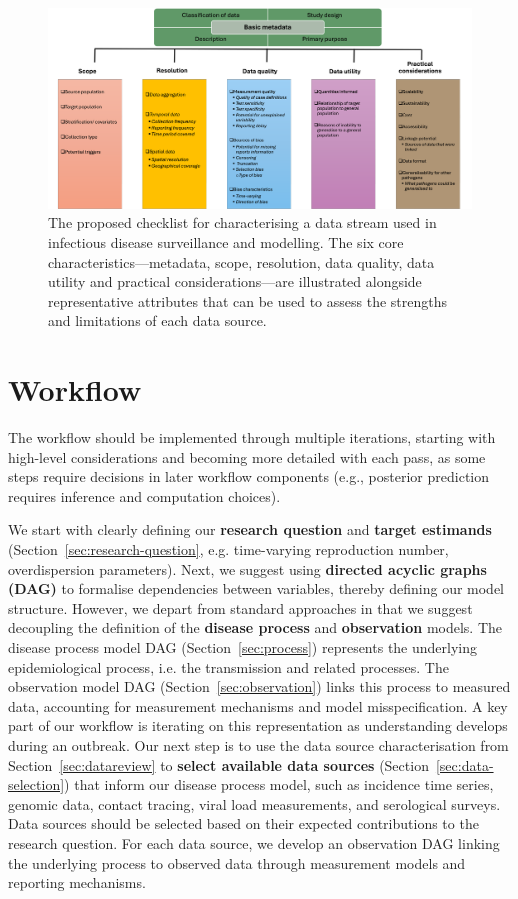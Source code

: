 \documentclass{article}
\begin{document}
\begin{figure}[H] 
\includegraphics[width=1\linewidth]{figures/data_characteristics_2.png}
\centering
\caption{The proposed checklist for characterising a data stream used in infectious disease surveillance and modelling. The six core characteristics---metadata, scope, resolution, data quality, data utility and practical considerations---are illustrated alongside representative attributes that can be used to assess the strengths and limitations of each data source. }
\label{data_characteristics}
\end{figure}


\section{Workflow}
\label{sec:workflow}

The workflow should be implemented through multiple iterations, starting with high-level considerations and becoming more detailed with each pass, as some steps require decisions in later workflow components (e.g., posterior prediction requires inference and computation choices).

We start with clearly defining our \textbf{research question} and \textbf{target estimands} (Section~\ref{sec:research-question}, e.g. time-varying reproduction number, overdispersion parameters). Next, we suggest using \textbf{directed acyclic graphs (DAG)} to formalise dependencies between variables, thereby defining our model structure. However, we depart from standard approaches in that we suggest decoupling the definition of the \textbf{disease process} and \textbf{observation} models. The disease process model DAG (Section~\ref{sec:process}) represents the underlying epidemiological process, i.e. the transmission and related processes. The observation model DAG (Section~\ref{sec:observation}) links this process to measured data, accounting for measurement mechanisms and model misspecification. A key part of our workflow is iterating on this representation as understanding develops during an outbreak. 
Our next step is to use the data source characterisation from Section~\ref{sec:datareview} to \textbf{select available data sources} (Section~\ref{sec:data-selection}) that inform our disease process model, such as incidence time series, genomic data, contact tracing, viral load measurements, and serological surveys. Data sources should be selected based on their expected contributions to the research question. For each data source, we develop an observation DAG linking the underlying process to observed data through measurement models and reporting mechanisms. 
\end{document}

